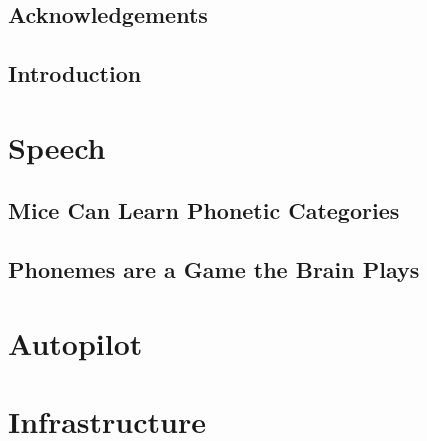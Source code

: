 

\addtocounter{page}{1}







\chapter*{Acknowledgements}



\tableofcontents%

\listoffigures

\listoftables
%
\mainmatter

\chapter{Introduction}





\part{Speech}

\chapter{Mice Can Learn Phonetic Categories}
\label{cha:mice_can_learn}





\chapter{Phonemes are a Game the Brain Plays}



\part{Autopilot}
\label{part:autopilot}



\clearpage







\part{Infrastructure}





